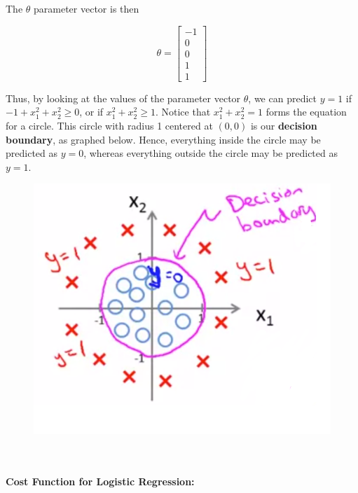 \documentclass{article}
\begin{document}
        \noindent The $\theta$ parameter vector is then

        \begin{equation*}
            \theta =
            \begin{bmatrix}
                -1 \\
                0 \\
                0 \\
                1 \\
                1
            \end{bmatrix}
        \end{equation*}

        \noindent Thus, by looking at the values of the parameter vector $\theta$, we can predict $y=1$ if
        $-1+x_1^2 + x_2^2\geq 0$, or if $x_1^2+x_2^2\geq 1$. Notice that $x_1^2+x_2^2=1$ forms the equation
        for a circle. This circle with radius 1 centered at $(0,0)$ is our \textbf{decision boundary}, as
        graphed below. Hence, everything inside the circle may be predicted as $y=0$, whereas everything
        outside the circle may be predicted as $y=1$.

        \begin{figure}[hbt!]
            \centering
            \includegraphics[scale=0.5]{Resources/Decision_Boundary2}
        \end{figure} \\\\

        \noindent \textbf{Cost Function for Logistic Regression:}
\end{document}
